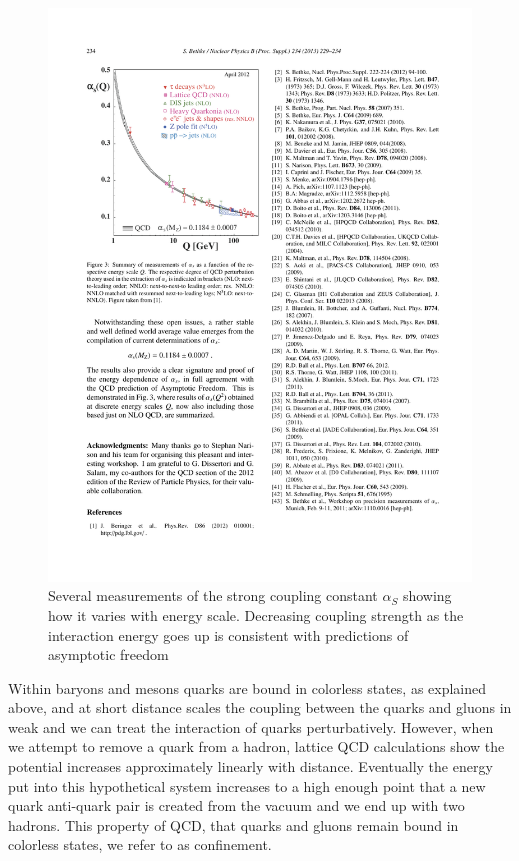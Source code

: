\begin{figure}[htbp]
\begin{center}
\includegraphics[scale=1.3]{Plots/Intro/asymp_free.pdf}
\end{center}
\caption[Asymptotic Freedom]{Several measurements of the strong coupling constant $\alpha_S$ showing how it varies with energy scale. Decreasing coupling strength as the interaction energy goes up is consistent with predictions of asymptotic freedom}
\label{fig:a_free}
\end{figure}

Within baryons and mesons quarks are bound in colorless states, as explained above, and at short distance scales the coupling between the quarks and gluons in weak and we can treat the interaction of quarks perturbatively. However, when we attempt to remove a quark from a hadron, lattice QCD calculations show the potential increases approximately linearly with distance. Eventually the energy put into this hypothetical system increases to a high enough point that a new quark anti-quark pair is created from the vacuum and we end up with two hadrons. This property of QCD, that quarks and gluons remain bound in colorless states, we refer to as confinement. 

